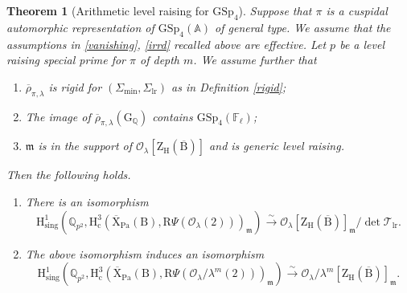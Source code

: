\documentclass[10pt]{amsart}
\numberwithin{equation}{section}
\newtheorem{theorem}[equation]{Theorem}
\theoremstyle{definition}
\def\GSp{\mathrm{GSp}}
\def\min{\mathrm{min}}
\def\lr{\mathrm{lr}}
\def\Pa{\mathrm{Pa}}
\def\sing{\mathrm{sing}}
\def\calO{\mathcal{O}}
\def\calT{\mathcal{T}}
\def\fracm{\mathfrak{m}}
\def\FF{\mathbb{F}}
\def\QQ{\mathbb{Q}}
\def\rmc{\mathrm{c}}
\def\rmB{\mathrm{B}}
\def\rmG{\mathrm{G}}
\def\rmH{\mathrm{H}}
\def\rmR{\mathrm{R}}
\def\rmX{\mathrm{X}}
\def\rmZ{\mathrm{Z}}
\begin{document}
\begin{theorem}[Arithmetic level raising for $\GSp_{4}$]\label{arithmetic-level-raising}
Suppose that $\pi$ is a cuspidal automorphic representation of $\GSp_{4}(\mathbb{A})$ of general type. We assume that the assumptions in \ref{vanishing}, \ref{irrd} recalled above are effective. Let $p$ be a level raising special prime for $\pi$ of depth $m$. We assume further that
\begin{enumerate}
\item $\overline{\rho}_{\pi,\lambda}$ is rigid for $(\Sigma_{\min}, \Sigma_{\lr})$ as in Definition \ref{rigid};
\item The image of $\overline{\rho}_{\pi,\lambda}(\rmG_{\QQ})$ contains $\GSp_{4}(\FF_{\ell})$;
\item $\fracm$ is in the support of $\calO_{\lambda}[\rmZ_{\rmH}(\overline{\rmB})]$ and is generic level raising.
\end{enumerate}

Then the following holds.
\begin{enumerate}
\item There is an isomorphism 
\begin{equation*}
\rmH^{1}_{\sing}(\QQ_{p^{2}}, \rmH^{3}_{\rmc}(\overline{\rmX}_{\Pa}(\rmB), \rmR\Psi(\calO_{\lambda}(2)))_{\fracm})\xrightarrow{\sim}\calO_{\lambda}[\rmZ_{\rmH}(\overline{\rmB})]_{\fracm}/\det\calT_{\lr}.
\end{equation*}

\item The above isomorphism induces an isomorphism
\begin{equation*}
\rmH^{1}_{\sing}(\QQ_{p^{2}}, \rmH^{3}_{\rmc}(\overline{\rmX}_{\Pa}(\rmB), \rmR\Psi(\calO_{\lambda}/\lambda^{m}(2)))_{\fracm})\xrightarrow{\sim}\calO_{\lambda}/\lambda^{m}[\rmZ_{\rmH}(\overline{\rmB})]_{\fracm}.
\end{equation*}
\end{enumerate}
\end{theorem}
\end{document}
